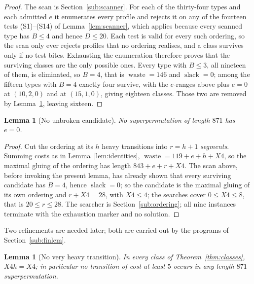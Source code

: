 \documentclass[10pt]{article}
\newtheorem{lemma}[theorem]{Lemma}
\theoremstyle{remark}
\theoremstyle{plain}
\newcommand{\slack}{\operatorname{slack}}
\newcommand{\waste}{\operatorname{waste}}
\begin{document}
\begin{proof}
The scan is Section~\ref{sub:scanner}.  For each of the thirty-four
types and each admitted $e$ it enumerates every profile and rejects it
on any of the fourteen tests (S1)--(S14) of Lemma~\ref{lem:scanner},
which applies
because every scanned type has $B\le 4$ and hence $D\le 20$.  Each test
is valid for every such ordering, so the scan only ever rejects
profiles that no ordering realises, and a class survives only if no
test bites.  Exhausting the
enumeration therefore proves that the surviving classes are the only
possible ones.  Every type with $B\le 3$, all nineteen of them, is
eliminated, so $B=4$, that is $\waste=146$ and $\slack=0$; among the
fifteen types with $B=4$ exactly four survive, with the $e$-ranges
above plus $e=0$ at $(10,2,0)$ and at $(15,1,0)$, giving eighteen
classes.  Those two are removed by Lemma~\ref{lem:e0}, leaving sixteen.
\end{proof}

\begin{lemma}[No unbroken candidate]\label{lem:e0}
No superpermutation of length $871$ has $e=0$.
\end{lemma}

\begin{proof}
Cut the ordering at its $h$ heavy transitions into $r=h+1$
\emph{segments}.  Summing costs as in Lemma~\ref{lem:identities},
$\waste=119+e+h+X4$, so the maximal gluing of the ordering has length
$843+e+r+X4$.  The scan above, before invoking the present lemma, has
already shown that every surviving candidate has $B=4$, hence
$\slack=0$; so the candidate is the maximal gluing of its own ordering
and $r+X4=28$, with $X4\le 4$; the searches cover $0\le X4\le 8$, that
is $20\le r\le 28$.  The searcher is
Section~\ref{sub:ordering}; all nine instances terminate with the
exhaustion marker and no solution.
\end{proof}

Two refinements are needed later; both are carried out by the programs
of Section~\ref{sub:finlem}.

\begin{lemma}[No very heavy transition]\label{lem:nofive}
In every class of Theorem~\ref{thm:classes}, $X4h=X4$; in particular no
transition of cost at least $5$ occurs in any length-$871$
superpermutation.
\end{lemma}
\end{document}

